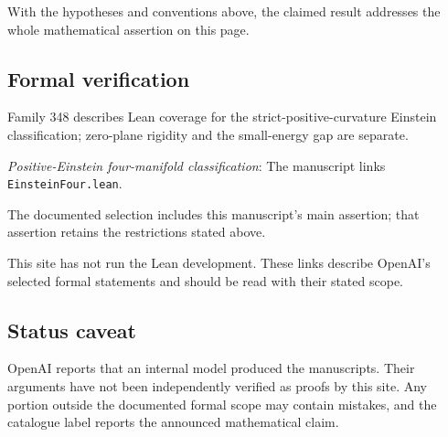 \documentclass[11pt]{article}
\begin{document}
With the hypotheses and conventions above, the claimed result addresses the whole mathematical assertion on this page.

\subsection{Formal verification}
Family 348 describes Lean coverage for the strict-positive-curvature Einstein classification; zero-plane rigidity and the small-energy gap are separate.

\textit{Positive-Einstein four-manifold classification}: The manuscript links \texttt{EinsteinFour.lean}.

The documented selection includes this manuscript’s main assertion; that assertion retains the restrictions stated above.

This site has not run the Lean development. These links describe OpenAI’s selected formal statements and should be read with their stated scope.

\subsection{Status caveat}
OpenAI reports that an internal model produced the manuscripts. Their arguments have not been independently verified as proofs by this site. Any portion outside the documented formal scope may contain mistakes, and the catalogue label reports the announced mathematical claim.
\end{document}
